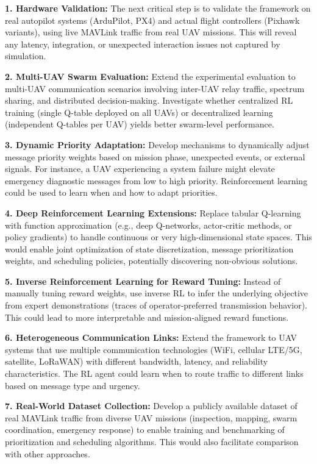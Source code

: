 \documentclass[pdflatex,sn-mathphys-num]{sn-jnl}%
\theoremstyle{thmstyleone}%
\theoremstyle{thmstyletwo}%
\theoremstyle{thmstylethree}%
\begin{document}
\textbf{1. Hardware Validation:} The next critical step is to validate the framework on real autopilot systems (ArduPilot, PX4) and actual flight controllers (Pixhawk variants), using live MAVLink traffic from real UAV missions. This will reveal any latency, integration, or unexpected interaction issues not captured by simulation.

\textbf{2. Multi-UAV Swarm Evaluation:} Extend the experimental evaluation to multi-UAV communication scenarios involving inter-UAV relay traffic, spectrum sharing, and distributed decision-making. Investigate whether centralized RL training (single Q-table deployed on all UAVs) or decentralized learning (independent Q-tables per UAV) yields better swarm-level performance.

\textbf{3. Dynamic Priority Adaptation:} Develop mechanisms to dynamically adjust message priority weights based on mission phase, unexpected events, or external signals. For instance, a UAV experiencing a system failure might elevate emergency diagnostic messages from low to high priority. Reinforcement learning could be used to learn when and how to adapt priorities.

\textbf{4. Deep Reinforcement Learning Extensions:} Replace tabular Q-learning with function approximation (e.g., deep Q-networks, actor-critic methods, or policy gradients) to handle continuous or very high-dimensional state spaces. This would enable joint optimization of state discretization, message prioritization weights, and scheduling policies, potentially discovering non-obvious solutions.

\textbf{5. Inverse Reinforcement Learning for Reward Tuning:} Instead of manually tuning reward weights, use inverse RL to infer the underlying objective from expert demonstrations (traces of operator-preferred transmission behavior). This could lead to more interpretable and mission-aligned reward functions.

\textbf{6. Heterogeneous Communication Links:} Extend the framework to UAV systems that use multiple communication technologies (WiFi, cellular LTE/5G, satellite, LoRaWAN) with different bandwidth, latency, and reliability characteristics. The RL agent could learn when to route traffic to different links based on message type and urgency.

\textbf{7. Real-World Dataset Collection:} Develop a publicly available dataset of real MAVLink traffic from diverse UAV missions (inspection, mapping, swarm coordination, emergency response) to enable training and benchmarking of prioritization and scheduling algorithms. This would also facilitate comparison with other approaches.
\end{document}
